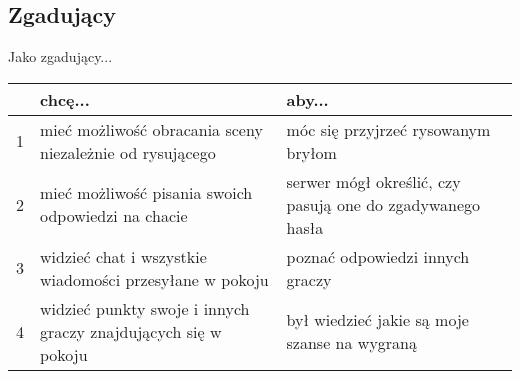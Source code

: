 \subsection{Zgadujący}
Jako zgadujący...
\begin{center}
    \begin{tabular}{ | l || p{5.5cm} | p{5.5cm} |}
    \hline
     & \textbf{chcę...} & \textbf{aby...} \\ \hline \hline
    1 & mieć możliwość obracania sceny niezależnie od rysującego & móc się przyjrzeć rysowanym bryłom \\ \hline
    2 & mieć możliwość pisania swoich odpowiedzi na chacie & serwer mógł określić, czy pasują one do zgadywanego hasła \\ \hline
    3 & widzieć chat i wszystkie wiadomości przesyłane w pokoju & poznać odpowiedzi innych graczy \\ \hline
    4 & widzieć punkty swoje i innych graczy znajdujących się w pokoju & był wiedzieć jakie są moje szanse na wygraną \\ \hline
    \end{tabular}
\end{center}